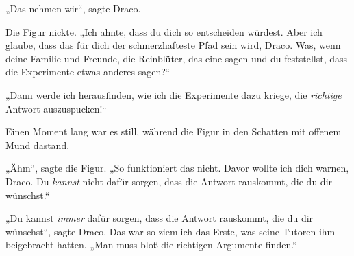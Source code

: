 „Das nehmen wir“, sagte Draco.

Die Figur nickte. „Ich ahnte, dass du dich so entscheiden würdest. Aber ich glaube, dass das für dich der schmerzhafteste Pfad sein wird, Draco. Was, wenn deine Familie und Freunde, die Reinblüter, das eine sagen und du feststellst, dass die Experimente etwas anderes sagen?“

„Dann werde ich herausfinden, wie ich die Experimente dazu kriege, die \emph{richtige} Antwort auszuspucken!“

Einen Moment lang war es still, während die Figur in den Schatten mit offenem Mund dastand.

„Ähm“, sagte die Figur. „So funktioniert das nicht. Davor wollte ich dich warnen, Draco. Du \emph{kannst} nicht dafür sorgen, dass die Antwort rauskommt, die du dir wünschst.“

„Du kannst \emph{immer} dafür sorgen, dass die Antwort rauskommt, die du dir wünschst“, sagte Draco. Das war so ziemlich das Erste, was seine Tutoren ihm beigebracht hatten. „Man muss bloß die richtigen Argumente finden.“

